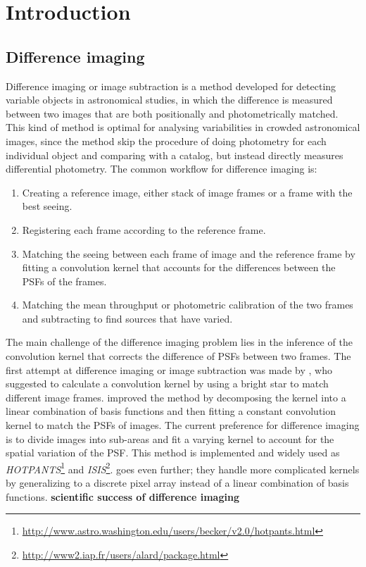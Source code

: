 \documentclass[12pt, preprint]{aastex}
\newcommand{\project}[1]{\textsl{#1}}
\newcommand{\todo}[1]{\textbf{#1}}
\begin{document}
\section{Introduction}

\subsection{Difference imaging}
Difference imaging or image subtraction is a method developed for detecting variable objects in astronomical studies, in which the difference is measured between two images that are both positionally and photometrically matched. This kind of method is optimal for analysing variabilities in crowded astronomical images, since the method skip the procedure of doing photometry for each individual object and comparing with a catalog, but instead directly measures differential photometry.
The common workflow for difference imaging is:
\begin{enumerate}
\item
Creating a reference image, either stack of image frames or a frame with the best seeing.
\item
Registering each frame according to the reference frame.
\item
Matching the seeing between each frame of image and the reference frame by fitting a convolution kernel that accounts for the differences between the PSFs of the frames.
\item
Matching the mean throughput or photometric calibration of the two frames and subtracting to find sources that have varied.
\end{enumerate}
The main challenge of the difference imaging problem lies in the inference of the convolution kernel that corrects the difference of PSFs between two frames.
The first attempt at difference imaging or image subtraction was made by \cite{imagesub1}, who suggested to calculate a convolution kernel by using a bright star to match different image frames. 
\cite{alard} improved the method by decomposing the kernel into a linear combination of basis functions and then fitting a constant convolution kernel to match the PSFs of images.
The current preference for difference imaging \citep{varyingkernel} is to divide images into sub-areas and fit a varying kernel to account for the spatial variation of the PSF. This method is implemented and widely used as \project{HOTPANTS}\footnote{\url{http://www.astro.washington.edu/users/becker/v2.0/hotpants.html}} and \project{ISIS}\footnote{\url{http://www2.iap.fr/users/alard/package.html}}. 
\cite{bramich} goes even further; they handle more complicated kernels by generalizing to a discrete pixel array instead of a linear combination of basis functions.
\todo{scientific success of difference imaging}
\end{document}
